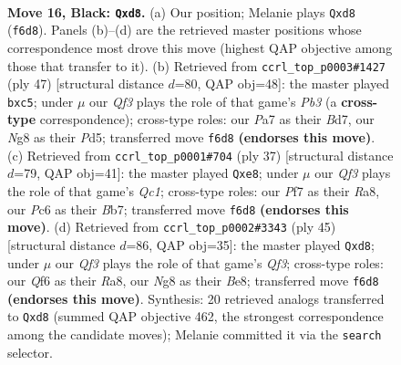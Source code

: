 \documentclass[11pt]{article}
\begin{document}
\clearpage

\begin{figure}[p]\centering
\begin{subfigure}{0.46\textwidth}\centering
\resizebox{\linewidth}{!}{%
\newchessgame
\chessboard[
  setfen={2kR2nr/p1p2ppp/1pp2q2/8/8/2P1QP2/bP4PP/2K2B1R b - - 0 16},
  showmover=false,
  pgfstyle=straightmove, color=movearrow, markmove={f6-d8}
]}
\caption{}
\end{subfigure}\hfill
\begin{subfigure}{0.46\textwidth}\centering
\resizebox{\linewidth}{!}{%
\newchessgame
\chessboard[
  setfen={r5k1/3b1pp1/1p5p/2Rp2q1/p2Q4/P2BP1P1/1P3P2/3R2K1 b - - 0 24},
  showmover=false,
  pgfstyle=straightmove, color=movearrow, markmove={b6-c5}
]}
\caption{}
\end{subfigure}
\\[4pt]
\begin{subfigure}{0.46\textwidth}\centering
\resizebox{\linewidth}{!}{%
\newchessgame
\chessboard[
  setfen={r1q1R1k1/pb1n1pp1/1p5p/3p4/3P3B/2PQ4/P2N1PPP/2R3K1 b - - 0 19},
  showmover=false,
  pgfstyle=straightmove, color=movearrow, markmove={c8-e8}
]}
\caption{}
\end{subfigure}\hfill
\begin{subfigure}{0.46\textwidth}\centering
\resizebox{\linewidth}{!}{%
\newchessgame
\chessboard[
  setfen={r2Rb1k1/pQ3pp1/4pq1p/8/2P5/1B6/P4PPP/4R1K1 b - - 0 23},
  showmover=false,
  pgfstyle=straightmove, color=movearrow, markmove={f6-d8}
]}
\caption{}
\end{subfigure}
\caption{\textbf{Move 16, Black: \texttt{Qxd8}.} (a) Our position; Melanie plays \texttt{Qxd8} (\texttt{f6d8}). Panels (b)--(d) are the retrieved master positions whose correspondence most drove this move (highest QAP objective among those that transfer to it). (b) Retrieved from \texttt{ccrl\_top\_p0003\#1427} (ply 47) [structural distance $d$=80, QAP obj=48]: the master played \texttt{bxc5}; under $\mu$ our \emph{Qf3} plays the role of that game's \emph{Pb3} (a \textbf{cross-type} correspondence); cross-type roles: our \emph{P}a7 as their \emph{B}d7, our \emph{N}g8 as their \emph{P}d5; transferred move \texttt{f6d8} \textbf{(endorses this move)}. (c) Retrieved from \texttt{ccrl\_top\_p0001\#704} (ply 37) [structural distance $d$=79, QAP obj=41]: the master played \texttt{Qxe8}; under $\mu$ our \emph{Qf3} plays the role of that game's \emph{Qc1}; cross-type roles: our \emph{P}f7 as their \emph{R}a8, our \emph{P}c6 as their \emph{B}b7; transferred move \texttt{f6d8} \textbf{(endorses this move)}. (d) Retrieved from \texttt{ccrl\_top\_p0002\#3343} (ply 45) [structural distance $d$=86, QAP obj=35]: the master played \texttt{Qxd8}; under $\mu$ our \emph{Qf3} plays the role of that game's \emph{Qf3}; cross-type roles: our \emph{Q}f6 as their \emph{R}a8, our \emph{N}g8 as their \emph{B}e8; transferred move \texttt{f6d8} \textbf{(endorses this move)}. Synthesis: 20 retrieved analogs transferred to \texttt{Qxd8} (summed QAP objective 462, the strongest correspondence among the candidate moves); Melanie committed it via the \texttt{search} selector.}
\label{fig:thought-m31}
\end{figure}
\end{document}
